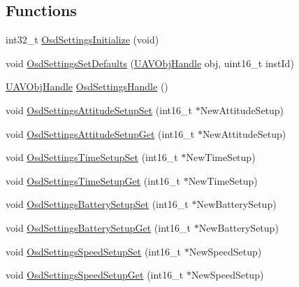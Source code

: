 \subsection*{\-Functions}
\begin{DoxyCompactItemize}
\item 
int32\-\_\-t \hyperlink{group___osd_settings_gacf7a72e7f35ad626f7174abbdd10d333}{\-Osd\-Settings\-Initialize} (void)
\item 
void \hyperlink{group___osd_settings_gad1c9bcdb3aadc3ae2b5f4cf2d4703c1e}{\-Osd\-Settings\-Set\-Defaults} (\hyperlink{targets_2_u_a_v_objects_2inc_2uavobjectmanager_8h_a279053e22be53ce9f895043aaeb91e3b}{\-U\-A\-V\-Obj\-Handle} obj, uint16\-\_\-t inst\-Id)
\item 
\hyperlink{targets_2_u_a_v_objects_2inc_2uavobjectmanager_8h_a279053e22be53ce9f895043aaeb91e3b}{\-U\-A\-V\-Obj\-Handle} \hyperlink{group___osd_settings_ga6b610597859296d82532876e4f442656}{\-Osd\-Settings\-Handle} ()
\item 
void \hyperlink{group___osd_settings_ga3d870d6e25f8157f725e06bed78db145}{\-Osd\-Settings\-Attitude\-Setup\-Set} (int16\-\_\-t $\ast$\-New\-Attitude\-Setup)
\item 
void \hyperlink{group___osd_settings_ga390c605ad3504ebcec28dd3760883404}{\-Osd\-Settings\-Attitude\-Setup\-Get} (int16\-\_\-t $\ast$\-New\-Attitude\-Setup)
\item 
void \hyperlink{group___osd_settings_gaa8451e88396200ef91e3d8d9de59719c}{\-Osd\-Settings\-Time\-Setup\-Set} (int16\-\_\-t $\ast$\-New\-Time\-Setup)
\item 
void \hyperlink{group___osd_settings_gae2dbcdf12729178bc299ea58c5a13e18}{\-Osd\-Settings\-Time\-Setup\-Get} (int16\-\_\-t $\ast$\-New\-Time\-Setup)
\item 
void \hyperlink{group___osd_settings_ga28cf4ffa059906c1b9ee4caf41854ba0}{\-Osd\-Settings\-Battery\-Setup\-Set} (int16\-\_\-t $\ast$\-New\-Battery\-Setup)
\item 
void \hyperlink{group___osd_settings_gabfd43ae345aeb59455b3a7b4758b8d9a}{\-Osd\-Settings\-Battery\-Setup\-Get} (int16\-\_\-t $\ast$\-New\-Battery\-Setup)
\item 
void \hyperlink{group___osd_settings_ga1b633bbb3727c8d31d2823436edbe1c3}{\-Osd\-Settings\-Speed\-Setup\-Set} (int16\-\_\-t $\ast$\-New\-Speed\-Setup)
\item 
void \hyperlink{group___osd_settings_gaefb4392c29b9f0674d02879a1979943d}{\-Osd\-Settings\-Speed\-Setup\-Get} (int16\-\_\-t $\ast$\-New\-Speed\-Setup)
\item 

\end{DoxyCompactItemize}
